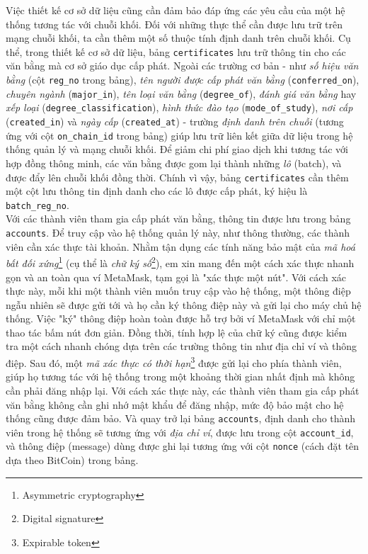 Việc thiết kế cơ sở dữ liệu cũng cần đảm bảo đáp ứng các yêu cầu của một hệ thống tương tác với chuỗi khối. Đối với những thực thể cần được lưu trữ trên mạng chuỗi khối, ta cần thêm một số thuộc tính định danh trên chuỗi khối. Cụ thể, trong thiết kế cơ sở dữ liệu, bảng \texttt{certificates} lưu trữ thông tin cho các văn bằng mà cơ sở giáo dục cấp phát. Ngoài các trường cơ bản - như \textit{số hiệu văn bằng} (cột \texttt{reg\_no} trong bảng), \textit{tên người được cấp phát văn bằng} (\texttt{conferred\_on}), \textit{chuyên ngành} (\texttt{major\_in}), \textit{tên loại văn bằng} (\texttt{degree\_of}), \textit{đánh giá văn bằng} hay \textit{xếp loại} (\texttt{degree\_classification}), \textit{hình thức đào tạo} (\texttt{mode\_of\_study}), \textit{nơi cấp} (\texttt{created\_in}) và \textit{ngày cấp} (\texttt{created\_at}) - trường \textit{định danh trên chuỗi} (tương ứng với cột \texttt{on\_chain\_id} trong bảng) giúp lưu trữ liên kết giữa dữ liệu trong hệ thống quản lý và mạng chuỗi khối. Để giảm chi phí giao dịch khi tương tác với hợp đồng thông minh, các văn bằng được gom lại thành những \textit{lô} (batch), và được đẩy lên chuỗi khối đồng thời. Chính vì vậy, bảng \texttt{certificates} cần thêm một cột lưu thông tin định danh cho các lô được cấp phát, ký hiệu là \texttt{batch\_reg\_no}.\\

Với các thành viên tham gia cấp phát văn bằng, thông tin được lưu trong bảng \texttt{accounts}. Để truy cập vào hệ thống quản lý này, như thông thường, các thành viên cần xác thực tài khoản. Nhằm tận dụng các tính năng bảo mật của \textit{mã hoá bất đối xứng}\footnote{Asymmetric cryptography} (cụ thể là \textit{chữ ký số}\footnote{Digital signature}), em xin mang đến một cách xác thực nhanh gọn và an toàn qua ví MetaMask, tạm gọi là "xác thực một nút". Với cách xác thực này, mỗi khi một thành viên muốn truy cập vào hệ thống, một thông điệp ngẫu nhiên sẽ được gửi tới và họ cần ký thông điệp này và gửi lại cho máy chủ hệ thống. Việc "ký" thông điệp hoàn toàn được hỗ trợ bởi ví MetaMask với chỉ một thao tác bấm nút đơn giản. Đồng thời, tính hợp lệ của chữ ký cũng được kiểm tra một cách nhanh chóng dựa trên các trường thông tin như địa chỉ ví và thông điệp. Sau đó, một \textit{mã xác thực có thời hạn}\footnote{Expirable token} được gửi lại cho phía thành viên, giúp họ tương tác với hệ thống trong một khoảng thời gian nhất định mà không cần phải đăng nhập lại. Với cách xác thực này, các thành viên tham gia cấp phát văn bằng không cần ghi nhớ mật khẩu để đăng nhập, mức độ bảo mật cho hệ thống cũng được đảm bảo. Và quay trở lại bảng \texttt{accounts}, định danh cho thành viên trong hệ thống sẽ tương ứng với \textit{địa chỉ ví}, được lưu trong cột \texttt{account\_id}, và thông điệp (message) dùng được ghi lại tương ứng với cột \texttt{nonce} (cách đặt tên dựa theo BitCoin) trong bảng.\\

